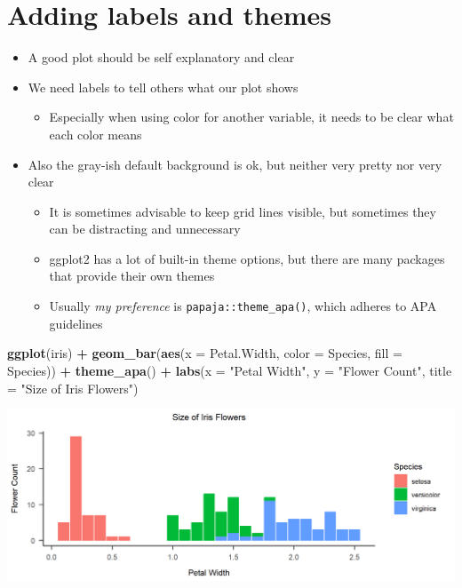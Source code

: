\documentclass[
]{book}
\newenvironment{Shaded}{\begin{snugshade}}{\end{snugshade}}
\newcommand{\AttributeTok}[1]{\textcolor[rgb]{0.13,0.29,0.53}{#1}}
\newcommand{\FunctionTok}[1]{\textcolor[rgb]{0.13,0.29,0.53}{\textbf{#1}}}
\newcommand{\NormalTok}[1]{#1}
\newcommand{\SpecialCharTok}[1]{\textcolor[rgb]{0.81,0.36,0.00}{\textbf{#1}}}
\newcommand{\StringTok}[1]{\textcolor[rgb]{0.31,0.60,0.02}{#1}}
\providecommand{\tightlist}{%
  \setlength{\itemsep}{0pt}\setlength{\parskip}{0pt}}
\begin{document}
\section{Adding labels and themes}\label{adding-labels-and-themes}

\begin{itemize}
\tightlist
\item
  A good plot should be self explanatory and clear
\item
  We need labels to tell others what our plot shows

  \begin{itemize}
  \tightlist
  \item
    Especially when using color for another variable, it needs to be clear what each color means
  \end{itemize}
\item
  Also the gray-ish default background is ok, but neither very pretty nor very clear

  \begin{itemize}
  \tightlist
  \item
    It is sometimes advisable to keep grid lines visible, but sometimes they can be distracting and unnecessary
  \item
    ggplot2 has a lot of built-in theme options, but there are many packages that provide their own themes
  \item
    Usually \emph{my preference} is \texttt{papaja::theme\_apa()}, which adheres to APA guidelines
  \end{itemize}
\end{itemize}

\begin{Shaded}
\begin{Highlighting}[]
\FunctionTok{ggplot}\NormalTok{(iris) }\SpecialCharTok{+} 
  \FunctionTok{geom\_bar}\NormalTok{(}\FunctionTok{aes}\NormalTok{(}\AttributeTok{x =}\NormalTok{ Petal.Width, }\AttributeTok{color =}\NormalTok{ Species, }\AttributeTok{fill =}\NormalTok{ Species)) }\SpecialCharTok{+}
  \FunctionTok{theme\_apa}\NormalTok{() }\SpecialCharTok{+}
  \FunctionTok{labs}\NormalTok{(}\AttributeTok{x =} \StringTok{"Petal Width"}\NormalTok{, }\AttributeTok{y =} \StringTok{"Flower Count"}\NormalTok{,}
       \AttributeTok{title =} \StringTok{"Size of Iris Flowers"}\NormalTok{)}
\end{Highlighting}
\end{Shaded}

\begin{flushleft}\includegraphics{_main_files/figure-html/themeslabels-1} \end{flushleft}
\end{document}
